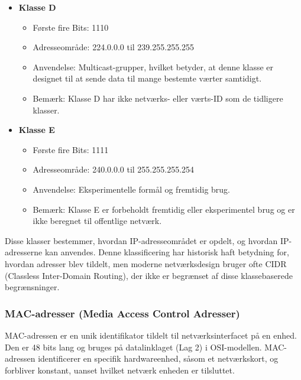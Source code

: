 \begin{itemize}
	
	\item[ ] \textbf{Klasse D}
	\begin{itemize}
		\item Første fire Bits: 1110
		\item Adresseområde: 224.0.0.0 til 239.255.255.255
		\item Anvendelse: Multicast-grupper, hvilket betyder, at denne klasse er designet til at sende data til mange bestemte værter samtidigt.
		\item Bemærk: Klasse D har ikke netværks- eller værts-ID som de tidligere klasser.
	\end{itemize}
	
	\item[ ] \textbf{Klasse E}
	\begin{itemize}
		\item Første fire Bits: 1111
		\item Adresseområde: 240.0.0.0 til 255.255.255.254
		\item Anvendelse: Eksperimentelle formål og fremtidig brug.
		\item Bemærk: Klasse E er forbeholdt fremtidig eller eksperimentel brug og er ikke beregnet til offentlige netværk.
	\end{itemize}
\end{itemize}
Disse klasser bestemmer, hvordan IP-adresseområdet er opdelt, og hvordan IP-adresserne kan anvendes. Denne klassificering har historisk haft betydning for, hvordan adresser blev tildelt, men moderne netværksdesign bruger ofte CIDR (Classless Inter-Domain Routing), der ikke er begrænset af disse klassebaserede begrænsninger.
\subsubsection{MAC-adresser (Media Access Control Adresser)}
MAC-adressen er en unik identifikator tildelt til netværksinterfacet på en enhed. Den er 48 bits lang og bruges på datalinklaget (Lag 2) i OSI-modellen. MAC-adressen identificerer en specifik hardwareenhed, såsom et netværkskort, og forbliver konstant, uanset hvilket netværk enheden er tilsluttet.
